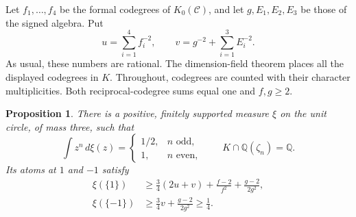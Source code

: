 \documentclass[11pt,a4paper]{article}
\newtheorem{proposition}[theorem]{Proposition}
\theoremstyle{definition}\newtheorem{definition}[theorem]{Definition}
\theoremstyle{remark}\newtheorem{remark}[theorem]{Remark}
\newcommand{\C}{\mathcal C}
\newcommand{\Q}{\mathbb Q}
\numberwithin{equation}{section}
\begin{document}
Let $f_1,\ldots,f_4$ be the formal codegrees of $K_0(\C)$,
and let $g,E_1,E_2,E_3$ be those of the signed algebra.  Put
\[
 u=\sum_{i=1}^4f_i^{-2},\qquad
 v=g^{-2}+\sum_{i=1}^3 E_i^{-2}.
\]
As usual, these numbers are rational.  The dimension-field theorem
\cite[Corollary~2.15]{Ostrik3} places all the displayed codegrees in $K$.
Throughout, codegrees are counted with their character multiplicities.
Both reciprocal-codegree sums equal one and $f,g\ge2$.

\begin{proposition}\label{cub:prop:cubic-corrected-average}
There is a positive, finitely supported measure $\xi$ on the unit circle,
of mass three, such that
\[
 \int z^n\,d\xi(z)=
 \begin{cases}1/2,&n\text{ odd},\\1,&n\text{ even},\end{cases}
 \qquad K\cap\Q(\zeta_n)=\Q.
\]
Its atoms at $1$ and $-1$ satisfy
\begin{align}
 \xi(\{1\})&\ge\frac34(2u+v)+\frac{f-2}{f^2}
                          +\frac{g-2}{2g^2},\label{cub:eq:positive-atom}\\
 \xi(\{-1\})&\ge\frac34v+\frac{g-2}{2g^2}\ge\frac14.
 \label{cub:eq:negative-atom}
\end{align}
\end{proposition}
\end{document}
